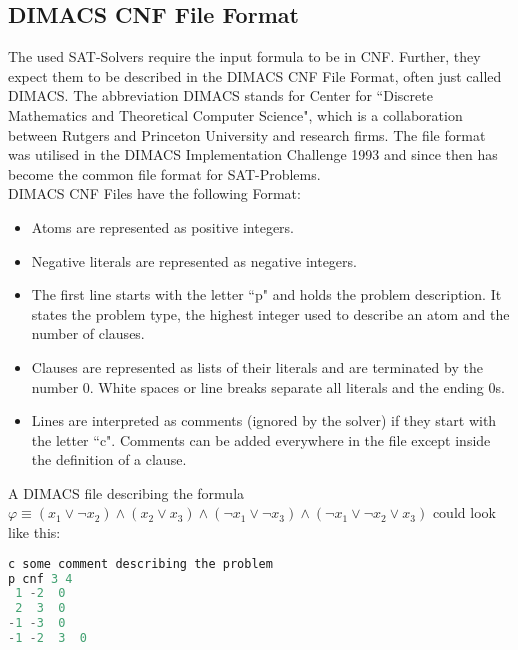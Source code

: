 \subsection{DIMACS CNF File Format}
The used SAT-Solvers require the input formula to be in CNF. Further, they expect them to be described in the DIMACS CNF File Format, often just called DIMACS. The abbreviation DIMACS stands for Center for ``Discrete Mathematics and Theoretical Computer Science", which is a collaboration between Rutgers and Princeton University and research firms. The file format was utilised in the DIMACS Implementation Challenge 1993 and since then has become the common file format for SAT-Problems.\\

DIMACS CNF Files have the following Format:
\begin{itemize}
    \item Atoms are represented as positive integers.
    \item Negative literals are represented as negative integers.
    \item The first line starts with the letter ``p" and holds the problem description. It states the problem type, the highest integer used to describe an atom and the number of clauses.
    \item Clauses are represented as lists of their literals and are terminated by the number 0. White spaces or line breaks separate all literals and the ending 0s.
    \item Lines are interpreted as comments (ignored by the solver) if they start with the letter ``c". Comments can be added everywhere in the file except inside the definition of a clause.
\end{itemize}
A DIMACS file describing the formula $\varphi \equiv (x_1 \lor \neg x_2) \land (x_2 \lor x_3) \land (\neg x_1 \lor \neg x_3) \land (\neg x_1 \lor \neg x_2 \lor x_3)$ could look like this:

\lstset{basicstyle=\ttfamily}
\begin{lstlisting}[language=Java,frame=single]
c some comment describing the problem
p cnf 3 4
 1 -2  0
 2  3  0
-1 -3  0
-1 -2  3  0
\end{lstlisting}


